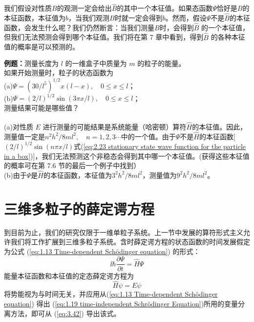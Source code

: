 	我们假设对性质$B$的观测一定会给出$\hat{B}$的其中一个本征值。如果态函数$\Psi$恰好是$B$的本征函数，本征值为$b$，当我们观测$B$时就一定会得到$b$。然而，假设$\Psi$不是$\hat{B}$的本征函数，会发生什么呢？我们仍然断言：当我们测量$B$时，会得到$\hat{B}$ 的一个本征值，但我们无法预测会得到哪个本征值。我们将在第 7 章中看到，得到$\hat{B}$ 的各种本征值的概率是可以预测的。
	\begin{examplebox}
		\textbf{例题：}测量长度为 $l$ 的一维盒子中质量为 $m$ 的粒子的能量。\\

		如果开始测量时，粒子的状态函数为\\
		(a)$\Psi = \left(30/l^5\right)^{1/2}x\left(l-x\right), \quad 0 \le x \le l$；\\
		(b)$\Psi = \left(2/l\right)^{1/2}\sin\left(3\pi x/l\right), \quad 0 \le x \le l$；\\
		测量结果可能是哪些值？\\
		\\
		(a)对性质 $E$ 进行测量的可能结果是系统能量（哈密顿）算符$\hat{H}$的本征值。因此，测量值一定是$n^2h^2/8ml^2, \quad n = 1,2,3\cdots$中的一个值。由于$\Psi$不是$\hat{H}$的本征函数[$\left(2/l\right)^{1/2}\sin\left(n\pi x/l\right)$式(\ref{eq:2.23 stationary state wave function for the particle in a box})]，我们无法预测这个非稳态会得到其中哪一个本征值。(获得这些本征值的概率可在第 7.6 节的最后一个例子中找到）\\
		(b)由于$\Psi$是$\hat{H}$的本征函数，本征值为$3^2h^2/8ml^2$，测量值为$9^2h^2/8ml^2$。
	\end{examplebox}
	
\section{三维多粒子的薛定谔方程}
\label{sec:3.4 The Three-Dimensional, Many-Particle Schrödinger Equation}
	到目前为止，我们的研究仅限于一维单粒子系统。上一节中发展的算符形式主义允许我们将工作扩展到三维多粒子系统。含时薛定谔方程的状态函数的时间发展假定为公式 (\ref{eq:1.13 Time-dependent Schödinger equation}) 的形式：
	\begin{equation}
		\boxed{
			\ii \hbar\frac{\partial \Psi}{\partial t} = \hat{H}\Psi
		}
		\label{eq:3.42}
	\end{equation}
	能量本征函数和本征值的定态薛定谔方程为
	\begin{equation}
		\boxed{
			\hat{H}\psi = E\psi
		}
		\label{eq:3.43}
	\end{equation}
	将势能视为与时间无关，并应用从(\ref{eq:1.13 Time-dependent Schödinger equation}) 得出 (\ref{eq:1.19 time-independent Schrödinger Equation})所用的变量分离方法，即可从 (\ref{eq:3.42}) 导出该式。

